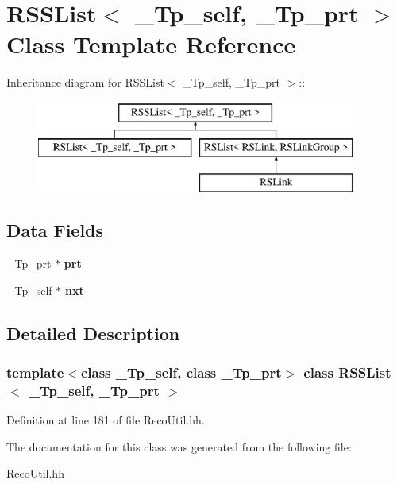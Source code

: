 \section{RSSList$<$ \_\-Tp\_\-self, \_\-Tp\_\-prt $>$ Class Template Reference}
\label{classRSSList}
Inheritance diagram for RSSList$<$ \_\-Tp\_\-self, \_\-Tp\_\-prt $>$::\begin{figure}[H]
\begin{center}
\leavevmode
\includegraphics[height=3cm]{classRSSList}
\end{center}
\end{figure}
\subsection*{Data Fields}
\begin{DoxyCompactItemize}
\item 
\_\-Tp\_\-prt $\ast$ {\bfseries prt}\label{classRSSList_a32492faa38b9366095481804cd97bcb4}

\item 
\_\-Tp\_\-self $\ast$ {\bfseries nxt}\label{classRSSList_a871423ffbc31df90605c30c123b2705b}

\end{DoxyCompactItemize}


\subsection{Detailed Description}
\subsubsection*{template$<$class \_\-Tp\_\-self, class \_\-Tp\_\-prt$>$ class RSSList$<$ \_\-Tp\_\-self, \_\-Tp\_\-prt $>$}



Definition at line 181 of file RecoUtil.hh.

The documentation for this class was generated from the following file:\begin{DoxyCompactItemize}
\item 
RecoUtil.hh\end{DoxyCompactItemize}
